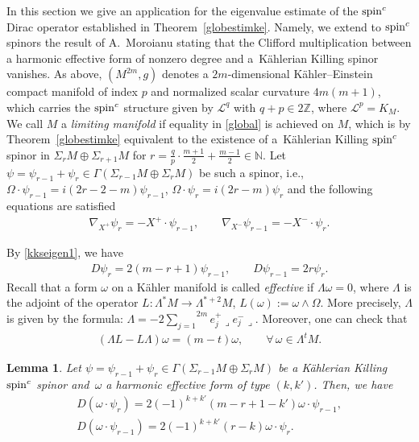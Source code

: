 \documentclass[10pt,a4paper]{amsart}
\numberwithin{equation}{section}
\newtheorem{lem}[thm]{Lemma}
\theoremstyle{definition}
\begin{document}
In this section we give an application for the eigenvalue estimate of the ${\mathop{\rm spin}^c}$ Dirac operator established in Theorem~\ref{globestimke}.
Namely, we extend to ${\mathop{\rm spin}^c}$ spinors the result of A.~Moroianu \cite{am} stating that
the Clif\/ford multiplication between a harmonic  ef\/fective form of nonzero degree and a~K\"ahlerian Killing spinor vanishes.
As above, $(M^{2m}, g)$ denotes a $2m$-dimensional K\"ahler--Einstein compact manifold of  index $p$ and normalized scalar curvature $4m(m+1)$, which carries the ${\mathop{\rm spin}^c}$ structure given by $\mathcal{L}^q$ with $q+p\in 2\mathbb{Z}$, where $\mathcal{L}^p=K_M$. We call $M$ a {\it limiting mani\-fold} if equality in \eqref{global} is achieved on $M$,  which is by Theorem~\ref{globestimke} equivalent to the existence of a~K\"ahlerian Killing ${\mathop{\rm spin}^c}$ spinor in $\Sigma_{r}M\oplus \Sigma_{r+1} M$ for $r=\frac{q}{p}\cdot\frac{m+1}{2}+\frac{m-1}{2}\in\mathbb{N}$.
Let $\psi=\psi_{r-1}+\psi_{r}\in \Gamma(\Sigma_{r-1} M \oplus \Sigma_{r} M)$ be such a spinor, i.e., $\Omega \cdot \psi_{r-1} = i (2r-2-m) \psi_{r-1}$, $\Omega \cdot \psi_{r} = i (2r-m) \psi_{r}$ and the following equations are satisf\/ied
\begin{gather*}
\nabla_{X^+}\psi_{r} =- X^+ \cdot \psi_{r-1},\qquad
\nabla_{X^-} \psi_{r-1} =- X^-\cdot \psi_{r}.
\end{gather*}

By \eqref{kkseigen1},  we  have
\begin{gather*}D\psi_{r}=2(m-r+1)\psi_{r-1}, \qquad D\psi_{r-1}=2r\psi_{r}.\end{gather*}
Recall that a form $\omega$ on a K\"ahler manifold is called {\it effective} if $\Lambda \omega = 0$, where $\Lambda$ is the adjoint of the operator
$L\colon\Lambda^{*} M \longrightarrow \Lambda^{*+2} M $, $L(\omega):=\omega\wedge\Omega$. More precisely, $\Lambda$ is given by the formula:
$\Lambda = -2 \overset{2m}{\underset{j=1}{\sum}} e_j^+  \lrcorner e_j^- \lrcorner$. Moreover, one can check that
\begin{gather*}%
(\Lambda L - L \Lambda ) \omega = (m-t) \omega, \qquad \forall\,  \omega \in \Lambda^t M.
\end{gather*}

\begin{lem}
Let $\psi=\psi_{r-1}+\psi_{r}\in\Gamma(\Sigma_{r-1} M \oplus \Sigma_{r} M)$ be a  K\"ahlerian Killing  ${\mathop{\rm spin}^c}$ spinor and~$\omega$ a harmonic effective form of type $(k, k')$. Then, we have
\begin{gather}\label{domeg1}
D(\omega\cdot\psi_{r})=2(-1)^{k+k'} (m-r+1-k') \omega\cdot\psi_{r-1},
\\ \label{domeg2}
D(\omega\cdot\psi_{r-1})=2(-1)^{k+k'} (r-k) \omega\cdot\psi_{r}.
\end{gather}
\end{lem}
\end{document}
